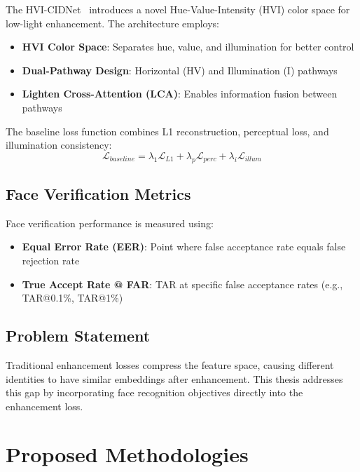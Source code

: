 \documentclass[12pt,a4paper]{article}
\begin{document}
The HVI-CIDNet~\cite{yan2025hvi} introduces a novel Hue-Value-Intensity (HVI) color space for low-light enhancement. The architecture employs:
\begin{itemize}
    \item \textbf{HVI Color Space}: Separates hue, value, and illumination for better control
    \item \textbf{Dual-Pathway Design}: Horizontal (HV) and Illumination (I) pathways
    \item \textbf{Lighten Cross-Attention (LCA)}: Enables information fusion between pathways
\end{itemize}

The baseline loss function combines L1 reconstruction, perceptual loss, and illumination consistency:
\begin{equation}
\mathcal{L}_{baseline} = \lambda_1 \mathcal{L}_{L1} + \lambda_p \mathcal{L}_{perc} + \lambda_i \mathcal{L}_{illum}
\end{equation}

\subsection{Face Verification Metrics}

Face verification performance is measured using:
\begin{itemize}
    \item \textbf{Equal Error Rate (EER)}: Point where false acceptance rate equals false rejection rate
    \item \textbf{True Accept Rate @ FAR}: TAR at specific false acceptance rates (e.g., TAR@0.1\%, TAR@1\%)
\end{itemize}

\subsection{Problem Statement}

Traditional enhancement losses compress the feature space, causing different identities to have similar embeddings after enhancement. This thesis addresses this gap by incorporating face recognition objectives directly into the enhancement loss.

\section{Proposed Methodologies}
\end{document}

